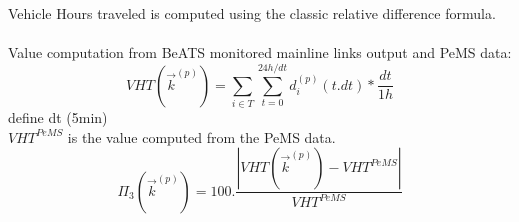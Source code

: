 Vehicle Hours traveled is computed using the classic relative difference formula.\\
\\
Value computation from BeATS monitored mainline links output and PeMS data:
\begin{equation*}
	 VHT(\vec{k}^{(p)})=\sum_{i\in{T}}\sum_{t=0}^{24h/dt}d^{(p)}_{i}(t.dt)*\frac{dt}{1h}
\end{equation*}\color{red} define dt (5min) \color{black}
\\
$VHT^{PeMS}$ is the value computed from the PeMS data.
\\
\begin{equation*}
	\Pi_{3}(\vec{k}^{(p)})=100.\frac{|VHT(\vec{k}^{(p)})-VHT^{PeMS}|}{VHT^{PeMS}}
\end{equation*}
